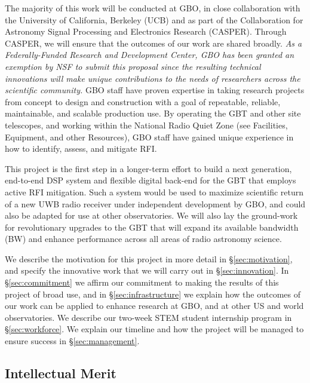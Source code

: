 \documentclass[10pt]{myNSF}
\begin{document}
\vspace{-1em} The majority of this work will be conducted at GBO, in
close collaboration with the University of California, Berkeley (UCB)
and as part of the Collaboration for Astronomy Signal Processing and
Electronics Research (CASPER).  Through CASPER, we will ensure that
the outcomes of our work are shared broadly.  \emph{As a
  Federally-Funded Research and Development Center, GBO has been
  granted an exemption by NSF to submit this proposal since the
  resulting technical innovations will make unique contributions to
  the needs of researchers across the scientific community.}  GBO
staff have proven expertise in taking research projects from concept
to design and construction with a goal of repeatable, reliable,
maintainable, and scalable production use.  By operating the GBT and
other site telescopes, and working within the National Radio Quiet
Zone (see Facilities, Equipment, and other Resources), GBO staff have
gained unique experience in how to identify, assess, and mitigate RFI.

This project is the first step in a longer-term effort to build a next
generation, end-to-end DSP system and flexible digital back-end for
the GBT that employs active RFI mitigation.  Such a system would be
used to maximize scientific return of a new UWB radio receiver under
independent development by GBO, and could also be adapted for use at
other observatories.  We will also lay the ground-work for
revolutionary upgrades to the GBT that will expand its available
bandwidth (BW) and enhance performance across all areas of radio
astronomy science.

We describe the motivation for this project in more detail in
\S\ref{sec:motivation}, and specify the innovative work that we will
carry out in \S\ref{sec:innovation}.  In \S\ref{sec:commitment} we
affirm our commitment to making the results of this project of broad
use, and in \S\ref{sec:infrastructure} we explain how the outcomes of
our work can be applied to enhance research at GBO, and at other US
and world observatories.  We describe our two-week STEM student
internship program in \S\ref{sec:workforce}.  We explain our timeline
and how the project will be managed to ensure success in
\S\ref{sec:management}.

\subsection{Intellectual Merit}
\label{sec:intellectual_merit}
\end{document}
